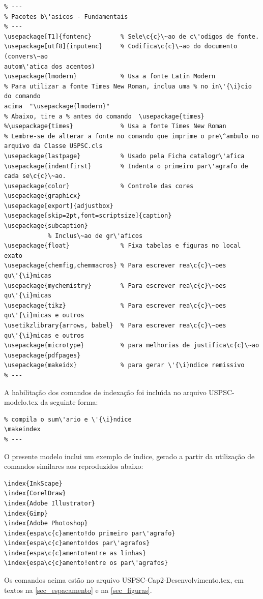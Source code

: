 \begin{verbatim}
% ---
% Pacotes b\'asicos - Fundamentais 
% ---
\usepackage[T1]{fontenc}		% Sele\c{c}\~ao de c\'odigos de fonte.
\usepackage[utf8]{inputenc}		% Codifica\c{c}\~ao do documento (convers\~ao 
autom\'atica dos acentos)
\usepackage{lmodern}			% Usa a fonte Latin Modern
% Para utilizar a fonte Times New Roman, inclua uma % no in\'{\i}cio do comando 
acima  "\usepackage{lmodern}"
% Abaixo, tire a % antes do comando  \usepackage{times}
%\usepackage{times}		    	% Usa a fonte Times New Roman	
% Lembre-se de alterar a fonte no comando que imprime o pre\^ambulo no 
arquivo da Classe USPSC.cls				
\usepackage{lastpage}			% Usado pela Ficha catalogr\'afica
\usepackage{indentfirst}		% Indenta o primeiro par\'agrafo de cada se\c{c}\~ao.
\usepackage{color}				% Controle das cores
\usepackage{graphicx}
\usepackage[export]{adjustbox}
\usepackage[skip=2pt,font=scriptsize]{caption}
\usepackage{subcaption}
			% Inclus\~ao de gr\'aficos
\usepackage{float} 				% Fixa tabelas e figuras no local exato
\usepackage{chemfig,chemmacros} % Para escrever rea\c{c}\~oes qu\'{\i}micas
\usepackage{mychemistry}        % Para escrever rea\c{c}\~oes qu\'{\i}micas
\usepackage{tikz}				% Para escrever rea\c{c}\~oes qu\'{\i}micas e outros
\usetikzlibrary{arrows, babel}	% Para escrever rea\c{c}\~oes qu\'{\i}micas e outros
\usepackage{microtype} 			% para melhorias de justifica\c{c}\~ao
\usepackage{pdfpages}
\usepackage{makeidx}            % para gerar \'{\i}ndice remissivo
% ---
\end{verbatim}

A habilita\c{c}\~ao dos comandos de indexa\c{c}\~ao foi inclu\'{\i}da no arquivo USPSC-modelo.tex da seguinte forma:


\begin{verbatim}
% compila o sum\'ario e \'{\i}ndice
\makeindex
% ---
\end{verbatim}

O presente modelo inclui um exemplo de \'{\i}ndice, gerado a partir da utiliza\c{c}\~ao de comandos similares aos reproduzidos abaixo:

\begin{verbatim}
\index{InkScape}
\index{CorelDraw}
\index{Adobe Illustrator}
\index{Gimp}
\index{Adobe Photoshop}
\index{espa\c{c}amento!do primeiro par\'agrafo}
\index{espa\c{c}amento!dos par\'agrafos}
\index{espa\c{c}amento!entre as linhas}
\index{espa\c{c}amento!entre os par\'agrafos}
\end{verbatim}

Os comandos acima est\~ao no arquivo USPSC-Cap2-Desenvolvimento.tex, em textos na  \autoref{sec_espacamento}  e na  \autoref{sec_figuras}.

